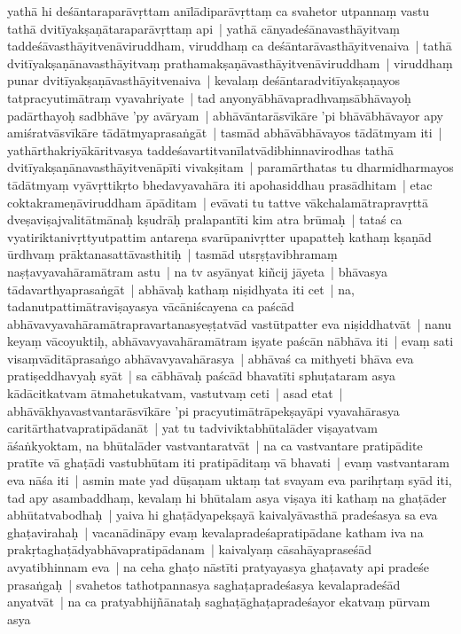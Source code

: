 \documentclass[article,a4paper]{memoir}
\newcommand{\name}[1]{#1}
\begin{document}
	  \pstart yathā\- hi deśā\-ntaraparā\-vṛttam anī\-lā\-diparā\-vṛttaṃ ca svahetor utpannaṃ vastu tathā\- dvitī\-yakṣaṇā\-taraparā\-vṛttaṃ api | yathā\- cā\-nyadeśā\-navasthā\-yitvaṃ taddeśā\-vasthā\-yitvenā\-viruddham, viruddhaṃ ca deśā\-ntarā\-vasthā\-yitvenaiva | tathā\- dvitī\-yakṣaṇā\-navasthā\-yitvaṃ prathamakṣaṇā\-vasthā\-yitvenā\-viruddham | viruddhaṃ punar dvitī\-yakṣaṇā\-vasthā\-yitvenaiva | kevalaṃ deśā\-ntaradvitī\-yakṣaṇayos tatpracyutimā\-traṃ vyavahriyate | tad anyonyā\-bhā\-vapradhvaṃsā\-bhā\-vayoḥ padā\-rthayoḥ sadbhā\-ve 'py avā\-ryam | abhā\-vā\-ntarā\-svī\-kā\-re 'pi bhā\-vā\-bhā\-vayor apy amiśratvā\-svī\-kā\-re tā\-dā\-tmyaprasaṅgā\-t | tasmā\-d abhā\-vā\-bhā\-vayos tā\-dā\-tmyam iti | \label{thakur75-122.16} yathā\-rthakriyā\-kā\-ritvasya taddeśavartitvanī\-latvā\-dibhinnavirodhas tathā\- dvitī\-yakṣaṇā\-navasthā\-yitvenā\-pī\-ti vivakṣitam | paramā\-rthatas tu dharmidharmayos tā\-dā\-tmyaṃ vyā\-vṛttikṛto bhedavyavahā\-ra iti \name{apohasiddhau} prasā\-dhitam | etac coktakrameṇā\-viruddham ā\-pā\-ditam | evā\-vati tu tattve vā\-kchalamā\-trapravṛttā\- dveṣaviṣajvalitā\-tmā\-naḥ kṣudrā\-ḥ pralapantī\-ti kim atra brū\-maḥ | \label{thakur75-122.21} tataś ca vyatiriktanivṛttyutpattim antareṇa svarū\-panivṛtter upapatteḥ kathaṃ kṣaṇā\-d ū\-rdhvaṃ prā\-ktanasattā\-vasthitiḥ | tasmā\-d utsṛṣṭavibhramaṃ naṣṭavyavahā\-ramā\-tram astu | na tv asyā\-nyat kiñcij jā\-yeta | \label{thakur75-122.23} bhā\-vasya tā\-davarthyaprasaṅgā\-t | abhā\-vaḥ kathaṃ niṣidhyata iti cet | \label{thakur75-122.24} na, tadanutpattimā\-traviṣayasya vā\-cā\-niścayena ca paścā\-d abhā\-vavyavahā\-ramā\-trapravartanasyeṣṭatvā\-d vastū\-tpatter eva niṣiddhatvā\-t | \label{thakur75-122.26} nanu keyaṃ vā\-coyuktiḥ, abhā\-vavyavahā\-ramā\-tram iṣyate paścā\-n nā\-bhā\-va iti | evaṃ sati visaṃvā\-ditā\-prasaṅgo abhā\-vavyavahā\-rasya | abhā\-vaś ca mithyeti bhā\-va eva pratiṣeddhavyaḥ syā\-t | sa cā\-bhā\-vaḥ paścā\-d bhavatī\-ti sphuṭataram asya kā\-dā\-citkatvam ā\-tmahetukatvam, vastutvaṃ ceti | \label{thakur75-122.29} asad etat | abhā\-vā\-khyavastvantarā\-svī\-kā\-re 'pi pracyutimā\-trā\-pekṣayā\-pi vyavahā\-rasya caritā\-rthatvapratipā\-danā\-t | yat tu tadviviktabhū\-talā\-der viṣayatvam ā\-śaṅkyoktam, na bhū\-talā\-der vastvantaratvā\-t | na ca vastvantare pratipā\-dite pratī\-te vā\- ghaṭā\-di vastubhū\-tam iti pratipā\-ditaṃ vā\- bhavati | \label{thakur75-123.1} evaṃ vastvantaram eva nā\-śa iti | asmin mate yad dū\-ṣaṇam uktaṃ tat svayam eva parihṛtaṃ syā\-d iti, tad apy asambaddhaṃ, kevalaṃ hi bhū\-talam asya viṣaya iti kathaṃ na ghaṭā\-der abhū\-tatvabodhaḥ | yaiva hi ghaṭā\-dyapekṣayā\- kaivalyā\-vasthā\- pradeśasya sa eva ghaṭavirahaḥ | vacanā\-dinā\-py evaṃ kevalapradeśapratipā\-dane katham iva na prakṛtaghaṭā\-dyabhā\-vapratipā\-danam | kaivalyaṃ cā\-sahā\-yapraseśā\-d avyatibhinnam eva | \label{thakur75-123.6} na ceha ghaṭo nā\-stī\-ti pratyayasya ghaṭavaty api pradeśe prasaṅgaḥ | svahetos tathotpannasya saghaṭapradeśasya kevalapradeśā\-d anyatvā\-t | \label{thakur75-123.7} na ca pratyabhijñā\-nataḥ saghaṭā\-ghaṭapradeśayor ekatvaṃ pū\-rvam asya 
\end{document}

